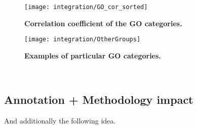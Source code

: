 \begin{figure}[!htbp]
\texttt{[image: integration/GO\_cor\_sorted]}\centering
    \caption[Correlation coefficient of the pairs for the GO
    categories]{\label{fig:GO_cor_sorted}\textbf{Correlation coefficient of the
    GO categories.}}
\end{figure}


\begin{figure}[!htbp]
\texttt{[image: integration/OtherGroups]}\centering
    \caption[Examples of particular GO
    categories]{\label{fig:GO_sub_groups}\textbf{Examples of particular GO
    categories.}}
\end{figure}





\clearpage\


\subsection{Annotation + Methodology impact}
And additionally the following idea.

